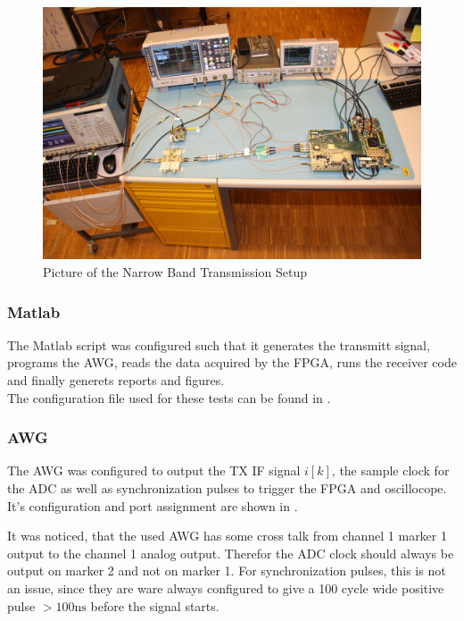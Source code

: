 \begin{figure}[p]
  \centering
  \includegraphics[width=\textwidth]{pictures/res_450_setup}
  \caption{Picture of the Narrow Band Transmission Setup}
  \label{fig:res_450_pic}
\end{figure}

\subsubsection{Matlab}
The Matlab script was configured such that it generates the transmitt signal,
programs the \gls{AWG}, reads the data acquired by the \gls{FPGA},
runs the receiver code and finally generets reports and figures. \\
The configuration file used for these tests can be found in
. \\

\subsubsection{\gls{AWG}}
The \gls{AWG} was configured to output the \gls{TX} \gls{IF} signal $i[k]$,
the sample clock for the \gls{ADC} as well as synchronization pulses to trigger
the \gls{FPGA} and oscillocope. It's configuration and port assignment
are shown in .

It was noticed, that the used \gls{AWG} has some cross talk from
channel 1 marker 1 output to the channel 1 analog output. Therefor the
\gls{ADC} clock should always be output on marker 2 and not on marker 1.
For synchronization pulses, this is not an issue, since they are ware always
configured to give a 100 cycle wide positive pulse $> 100 \text{ns}$ before
the signal starts. \\

